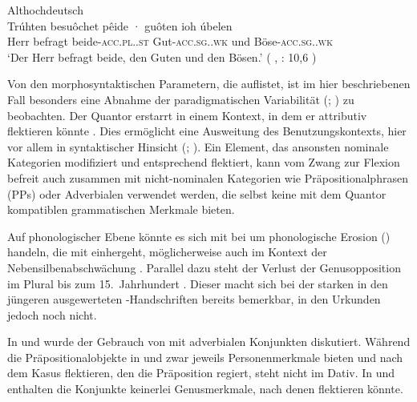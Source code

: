 \begin{exe}
\ex \label{ex:beidejohahd_2_copy}
	\langinfo%
		{Althochdeutsch}%
		{}%
		{\cite[35]{tax1979}}\\
	\gll Trúhten besuôchet pêide · guôten ioh úbelen \\
			Herr befragt beide-\textsc{acc.pl.\MascA.st} {}
				Gut-\textsc{acc.sg.\MascA.wk} und
				Böse-\textsc{acc.sg.\MascA.wk} \\
		\trans `Der Herr befragt beide, den Guten und den Bösen.'
			(%
				, : 10,6%
			)
\end{exe}

Von den morphosyntaktischen Parametern, die \citet[174]{lehmann2015} auflistet,
ist im hier beschriebenen Fall besonders eine Abnahme der paradigmatischen
Variabilität (; \cite[146--150]{lehmann2015}) zu
beobachten. Der Quantor erstarrt in einem Kontext, in dem er attributiv
flektieren könnte . Dies
ermöglicht eine Ausweitung des Benutzungskontexts, hier vor allem in
syntaktischer Hinsicht (;
\cite[150--151]{lehmann2015}). Ein Element, das ansonsten nominale Kategorien
modifiziert und entsprechend flektiert, kann vom Zwang zur Flexion befreit auch
zusammen mit nicht-nominalen Kategorien wie Präpositionalphrasen (PPs) oder
Adverbialen verwendet werden, die selbst keine mit dem Quantor
kompatiblen grammatischen Merkmale bieten.

Auf phonologischer Ebene könnte es sich mit \citet[134--136]{lehmann2015} bei
 um phonologische Erosion () handeln,
die mit  einhergeht, möglicherweise auch im Kontext
der Nebensilbenabschwächung \autocite[88--92]{braune2018}. Parallel dazu steht
der Verlust der Genusopposition im Plural bis
zum 15.~Jahrhundert \autocites[203]{paul2007}[191--192]{reichmannwegera1993}.
Dieser macht sich bei der starken  in den jüngeren
ausgewerteten \KC{}-Handschriften bereits bemerkbar, in den Urkunden jedoch
noch nicht.

In  und 
wurde der Gebrauch von  mit adverbialen Konjunkten
diskutiert. Während die Präpositionalobjekte in  und
 zwar jeweils Personenmerkmale bieten und nach dem
Kasus flektieren, den die Präposition regiert, steht  nicht im
Dativ. In  und  enthalten die
Konjunkte keinerlei Genusmerkmale, nach denen 
flektieren könnte.


